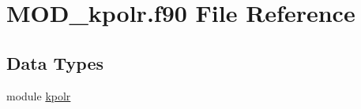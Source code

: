 \hypertarget{MOD__kpolr_8f90}{\section{M\-O\-D\-\_\-kpolr.\-f90 File Reference}
\label{MOD__kpolr_8f90}
}
\subsection*{Data Types}
\begin{DoxyCompactItemize}
\item 
module \hyperlink{classkpolr}{kpolr}
\end{DoxyCompactItemize}
